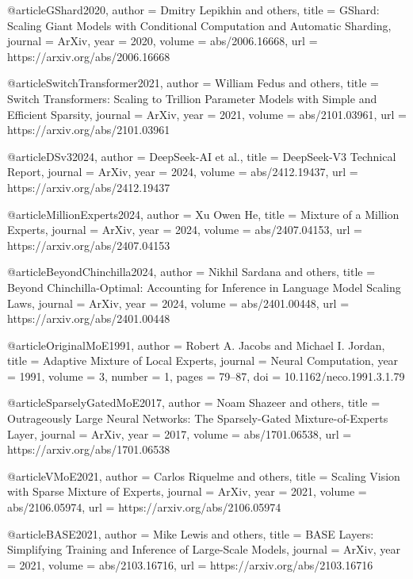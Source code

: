 @article{GShard2020,
  author    = {Dmitry Lepikhin and others},
  title     = {GShard: Scaling Giant Models with Conditional Computation and Automatic Sharding},
  journal   = {ArXiv},
  year      = {2020},
  volume    = {abs/2006.16668},
  url       = {https://arxiv.org/abs/2006.16668}
}

@article{SwitchTransformer2021,
  author    = {William Fedus and others},
  title     = {Switch Transformers: Scaling to Trillion Parameter Models with Simple and Efficient Sparsity},
  journal   = {ArXiv},
  year      = {2021},
  volume    = {abs/2101.03961},
  url       = {https://arxiv.org/abs/2101.03961}
}

@article{DSv32024,
  author    = {DeepSeek-AI et al.},
  title     = {DeepSeek-V3 Technical Report},
  journal   = {ArXiv},
  year      = {2024},
  volume    = {abs/2412.19437},
  url       = {https://arxiv.org/abs/2412.19437}
}

@article{MillionExperts2024,
  author    = {Xu Owen He},
  title     = {Mixture of a Million Experts},
  journal   = {ArXiv},
  year      = {2024},
  volume    = {abs/2407.04153},
  url       = {https://arxiv.org/abs/2407.04153}
}

@article{BeyondChinchilla2024,
  author    = {Nikhil Sardana and others},
  title     = {Beyond Chinchilla-Optimal: Accounting for Inference in Language Model Scaling Laws},
  journal   = {ArXiv},
  year      = {2024},
  volume    = {abs/2401.00448},
  url       = {https://arxiv.org/abs/2401.00448}
}

@article{OriginalMoE1991,
  author    = {Robert A. Jacobs and Michael I. Jordan},
  title     = {Adaptive Mixture of Local Experts},
  journal   = {Neural Computation},
  year      = {1991},
  volume    = {3},
  number    = {1},
  pages     = {79--87},
  doi       = {10.1162/neco.1991.3.1.79}
}

@article{SparselyGatedMoE2017,
  author    = {Noam Shazeer and others},
  title     = {Outrageously Large Neural Networks: The Sparsely-Gated Mixture-of-Experts Layer},
  journal   = {ArXiv},
  year      = {2017},
  volume    = {abs/1701.06538},
  url       = {https://arxiv.org/abs/1701.06538}
}

@article{VMoE2021,
  author    = {Carlos Riquelme and others},
  title     = {Scaling Vision with Sparse Mixture of Experts},
  journal   = {ArXiv},
  year      = {2021},
  volume    = {abs/2106.05974},
  url       = {https://arxiv.org/abs/2106.05974}
}

@article{BASE2021,
  author    = {Mike Lewis and others},
  title     = {BASE Layers: Simplifying Training and Inference of Large-Scale Models},
  journal   = {ArXiv},
  year      = {2021},
  volume    = {abs/2103.16716},
  url       = {https://arxiv.org/abs/2103.16716}
}

